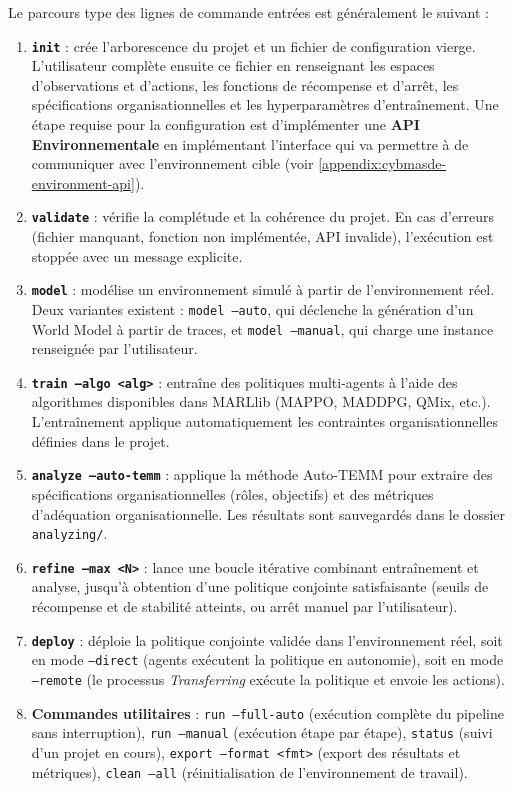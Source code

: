 \medskip

\noindent Le parcours type des lignes de commande entrées est généralement le suivant :
\begin{enumerate}
  \item \textbf{\texttt{init}} : crée l'arborescence du projet et un fichier de configuration vierge.
        L'utilisateur complète ensuite ce fichier en renseignant les espaces d'observations et d'actions, les fonctions de récompense et d'arrêt, les spécifications organisationnelles et les hyperparamètres d'entraînement. Une étape requise pour la configuration est d'implémenter une \textbf{API Environnementale} en implémentant l'interface  qui va permettre à  de communiquer avec l'environnement cible (voir \autoref{appendix:cybmasde-environment-api}).
  \item \textbf{\texttt{validate}} : vérifie la complétude et la cohérence du projet.
        En cas d'erreurs (fichier manquant, fonction non implémentée, API invalide), l'exécution est stoppée avec un message explicite.
  \item \textbf{\texttt{model}} : modélise un environnement simulé à partir de l'environnement réel.
        Deux variantes existent :
        \texttt{model --auto}, qui déclenche la génération d'un World Model à partir de traces, et
        \texttt{model --manual}, qui charge une instance  renseignée par l'utilisateur.
  \item \textbf{\texttt{train --algo <alg>}} : entraîne des politiques multi-agents à l'aide des algorithmes disponibles dans MARLlib (MAPPO, MADDPG, QMix, etc.).
        L'entraînement applique automatiquement les contraintes organisationnelles définies dans le projet.
  \item \textbf{\texttt{analyze --auto-temm}} : applique la méthode Auto-TEMM pour extraire des spécifications organisationnelles (rôles, objectifs) et des métriques d'adéquation organisationnelle.
        Les résultats sont sauvegardés dans le dossier \texttt{analyzing/}.
  \item \textbf{\texttt{refine --max <N>}} : lance une boucle itérative combinant entraînement et analyse, jusqu'à obtention d'une politique conjointe satisfaisante (seuils de récompense et de stabilité atteints, ou arrêt manuel par l'utilisateur).
  \item \textbf{\texttt{deploy}} : déploie la politique conjointe validée dans l'environnement réel, soit en mode \texttt{--direct} (agents exécutent la politique en autonomie), soit en mode \texttt{--remote} (le processus \textit{Transferring} exécute la politique et envoie les actions).
  \item \textbf{Commandes utilitaires} :
        \texttt{run --full-auto} (exécution complète du pipeline sans interruption),
        \texttt{run --manual} (exécution étape par étape),
        \texttt{status} (suivi d'un projet en cours),
        \texttt{export --format <fmt>} (export des résultats et métriques),
        \texttt{clean --all} (réinitialisation de l'environnement de travail).
\end{enumerate}

